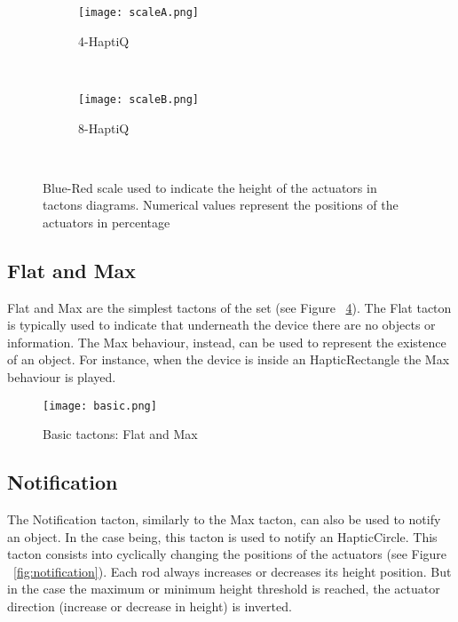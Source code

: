 \begin{figure}[H]
        \centering
        \begin{subfigure}[H]{0.7\textwidth}
                \texttt{[image: scaleA.png]}
                \caption{4-HaptiQ}
                \label{fig:scale-4}
        \end{subfigure}%
        ~ %
          
        \begin{subfigure}[H]{0.7\textwidth}
                \texttt{[image: scaleB.png]}
                \caption{8-HaptiQ}
                \label{fig:scale-8}
        \end{subfigure}
        ~ %
        \caption{Blue-Red scale used to indicate the height of the actuators in tactons diagrams. Numerical values represent the positions of the actuators in percentage}
        \label{fig:scales}
\end{figure}

\subsection{Flat and Max}

Flat and Max are the simplest tactons of the set (see Figure ~\ref{fig:Basictactons}). The Flat tacton is typically used to indicate that underneath the device there are no objects or information. The Max behaviour, instead, can be used to represent the existence of an object. For instance, when the device is inside an HapticRectangle the Max behaviour is played. 

\begin{figure}[H]
  \centering
  \texttt{[image: basic.png]}
  \caption{Basic tactons: Flat and Max}
  \label{fig:Basictactons}
\end{figure}

\subsection{Notification}

The Notification tacton, similarly to the Max tacton, can also be used to notify an object. In the case being, this tacton is used to notify an HapticCircle. This tacton consists into cyclically changing the positions of the actuators (see Figure ~\ref{fig:notification}). Each rod always increases or decreases its height position. But in the case the maximum or minimum height threshold is reached, the actuator direction (increase or decrease in height) is inverted.

